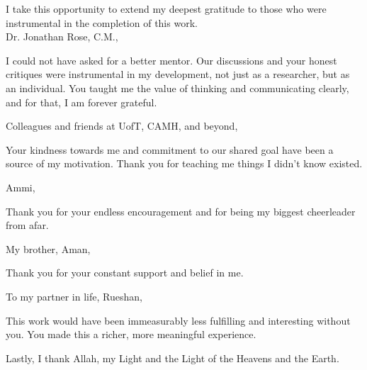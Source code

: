 \noindent I take this opportunity to extend my deepest gratitude to those who were instrumental in the completion of this work.\\

\noindent Dr. Jonathan Rose, C.M.,\vspace{-5pt}
\begin{addmargin}[1em]{2em}
I could not have asked for a better mentor. Our discussions and your honest critiques were instrumental in my development, not just as a researcher, but as an individual. You taught me the value of thinking and communicating clearly, and for that, I am forever grateful.\\
\end{addmargin}

\noindent Colleagues and friends at UofT, CAMH, and beyond,\vspace{-5pt}
\begin{addmargin}[1em]{2em}
\indent Your kindness towards me and commitment to our shared goal have been a source of my motivation. Thank you for teaching me things I didn't know existed.\\
\end{addmargin}

\noindent Ammi,\vspace{-5pt}
\begin{addmargin}[1em]{2em}
Thank you for your endless encouragement and for being my biggest cheerleader from afar.\\
\end{addmargin}

\noindent My brother, Aman,\vspace{-5pt}
\begin{addmargin}[1em]{2em}
Thank you for your constant support and belief in me.\\
\end{addmargin}


\noindent To my partner in life, Rueshan,\vspace{-5pt}
\begin{addmargin}[1em]{2em}
\indent This work would have been immeasurably less fulfilling and interesting without you. You made this a richer, more meaningful experience.\\
\end{addmargin}

\noindent Lastly, I thank Allah, my Light and the Light of the Heavens and the Earth.